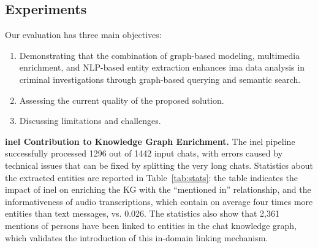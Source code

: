 
\subsection{Experiments}
\label{sec:wise_experiments}

Our evaluation has three main objectives:
\begin{enumerate}
  \item Demonstrating that the combination of graph-based modeling, multimedia enrichment, and NLP-based entity extraction enhances \ac{ima} data analysis in criminal investigations through graph-based querying and semantic search.
  \item Assessing the current quality of the proposed solution.
  \item Discussing limitations and challenges.
\end{enumerate} 
      



\textbf{\ac{inel} Contribution to Knowledge Graph Enrichment.} The \ac{inel} pipeline successfully processed 1296 out of 1442 input chats, with errors caused by technical issues that can be fixed by splitting the very long chats. Statistics about the extracted entities are reported in Table~\ref{tab:stats}: the table indicates the impact of \ac{inel} on enriching the KG with the ``mentioned in'' relationship, 
and the informativeness of audio transcriptions, which contain on average four times more entities than text messages,  vs. 0.026.
The statistics also show that 2,361 mentions of persons have been linked to entities in the chat knowledge graph, which validates the introduction of this in-domain linking mechanism.

